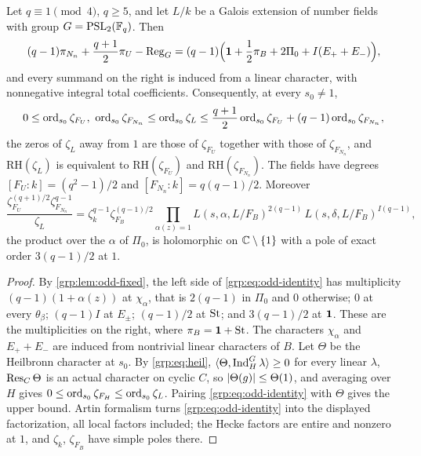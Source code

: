 \begin{theorem}\label{grp:thm:odd-twofield}
Let $q\equiv1\pmod4$, $q\ge5$, and let $L/k$ be a Galois extension of number fields with group
$G=\operatorname{PSL}_2(\mathbb{F}_q)$. Then
\begin{equation}\label{grp:eq:odd-identity}
 (q-1)\pi_{N_n}+\frac{q+1}2\pi_U-\operatorname{Reg}_G
 =(q-1)\Bigl(\mathbf{1}+\frac12\pi_B+2\Pi_0+I(E_++E_-)\Bigr),
\end{equation}
and every summand on the right is induced from a linear character, with nonnegative integral
total coefficients. Consequently, at every $s_0\ne1$,
\[
 0\le\ord_{s_0}\zeta_{F_U},\ \ord_{s_0}\zeta_{F_{N_n}}\le\ord_{s_0}\zeta_L
 \le\frac{q+1}2\ord_{s_0}\zeta_{F_U}+(q-1)\ord_{s_0}\zeta_{F_{N_n}} ,
\]
the zeros of $\zeta_L$ away from $1$ are those of $\zeta_{F_U}$ together with those of
$\zeta_{F_{N_n}}$, and $\mathrm{RH}(\zeta_L)$ is equivalent to $\mathrm{RH}(\zeta_{F_U})$ and
$\mathrm{RH}(\zeta_{F_{N_n}})$. The fields have degrees $[F_U:k]=(q^2-1)/2$ and
$[F_{N_n}:k]=q(q-1)/2$. Moreover
\[
 \frac{\zeta_{F_U}^{(q+1)/2}\zeta_{F_{N_n}}^{q-1}}{\zeta_L}
 =\zeta_k^{q-1}\zeta_{F_B}^{(q-1)/2}\prod_{\alpha(z)=1}L(s,\alpha,L/F_B)^{2(q-1)}\,
 L(s,\delta,L/F_B)^{I(q-1)},
\]
the product over the $\alpha$ of $\Pi_0$, is holomorphic on $\mathbb{C}\setminus\{1\}$ with a pole of exact
order $3(q-1)/2$ at $1$.
\end{theorem}
\begin{proof}
By \cref{grp:lem:odd-fixed}, the left side of \eqref{grp:eq:odd-identity} has multiplicity
$(q-1)(1+\alpha(z))$ at $\chi_\alpha$, that is $2(q-1)$ in $\Pi_0$ and $0$ otherwise; $0$ at every
$\theta_\beta$; $(q-1)I$ at $E_\pm$; $(q-1)/2$ at $\mathrm{St}$; and $3(q-1)/2$ at $\mathbf{1}$. These are the
multiplicities on the right, where $\pi_B=\mathbf{1}+\mathrm{St}$. The characters $\chi_\alpha$ and
$E_++E_-$ are induced from nontrivial linear characters of $B$. Let $\Theta$ be the Heilbronn
character at $s_0$. By \eqref{grp:eq:heil}, $\langle\Theta,\operatorname{Ind}_H^G\lambda\rangle\ge0$ for every
linear $\lambda$, $\operatorname{Res}_C\Theta$ is an actual character on cyclic $C$, so
$\lvert\Theta(g)\rvert\le\Theta(1)$, and averaging over $H$ gives
$0\le\operatorname{ord}_{s_0}\zeta_{F_H}\le\operatorname{ord}_{s_0}\zeta_L$. Pairing \eqref{grp:eq:odd-identity} with $\Theta$
gives the upper bound. Artin formalism turns \eqref{grp:eq:odd-identity} into the displayed
factorization, all local factors included; the Hecke factors are entire and nonzero at $1$,
and $\zeta_k$, $\zeta_{F_B}$ have simple poles there.
\end{proof}

